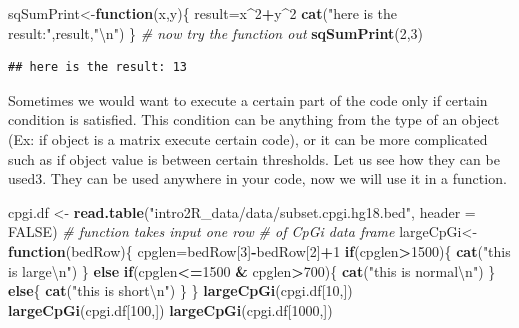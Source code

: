 \documentclass[12pt,]{krantz}
\newenvironment{Shaded}{\begin{snugshade}}{\end{snugshade}}
\newcommand{\CharTok}[1]{\textcolor[rgb]{0.31,0.60,0.02}{#1}}
\newcommand{\CommentTok}[1]{\textcolor[rgb]{0.56,0.35,0.01}{\textit{#1}}}
\newcommand{\ControlFlowTok}[1]{\textcolor[rgb]{0.13,0.29,0.53}{\textbf{#1}}}
\newcommand{\DataTypeTok}[1]{\textcolor[rgb]{0.13,0.29,0.53}{#1}}
\newcommand{\DecValTok}[1]{\textcolor[rgb]{0.00,0.00,0.81}{#1}}
\newcommand{\KeywordTok}[1]{\textcolor[rgb]{0.13,0.29,0.53}{\textbf{#1}}}
\newcommand{\NormalTok}[1]{#1}
\newcommand{\OperatorTok}[1]{\textcolor[rgb]{0.81,0.36,0.00}{\textbf{#1}}}
\newcommand{\OtherTok}[1]{\textcolor[rgb]{0.56,0.35,0.01}{#1}}
\newcommand{\StringTok}[1]{\textcolor[rgb]{0.31,0.60,0.02}{#1}}
\theoremstyle{definition}
\theoremstyle{definition}
\theoremstyle{definition}
\theoremstyle{remark}
\begin{document}
\begin{Shaded}
\begin{Highlighting}[]
\NormalTok{sqSumPrint<-}\ControlFlowTok{function}\NormalTok{(x,y)\{}
\NormalTok{result=x}\OperatorTok{^}\DecValTok{2}\OperatorTok{+}\NormalTok{y}\OperatorTok{^}\DecValTok{2}
\KeywordTok{cat}\NormalTok{(}\StringTok{"here is the result:"}\NormalTok{,result,}\StringTok{"}\CharTok{\textbackslash{}n}\StringTok{"}\NormalTok{)}
\NormalTok{\}}
\CommentTok{# now try the function out}
\KeywordTok{sqSumPrint}\NormalTok{(}\DecValTok{2}\NormalTok{,}\DecValTok{3}\NormalTok{)}
\end{Highlighting}
\end{Shaded}

\begin{verbatim}
## here is the result: 13
\end{verbatim}

Sometimes we would want to execute a certain part of the code only if
certain condition is satisfied. This condition can be anything from the
type of an object (Ex: if object is a matrix execute certain code), or
it can be more complicated such as if object value is between certain
thresholds. Let us see how they can be used3. They can be used anywhere
in your code, now we will use it in a function.

\begin{Shaded}
\begin{Highlighting}[]
\NormalTok{cpgi.df <-}\StringTok{ }\KeywordTok{read.table}\NormalTok{(}\StringTok{"intro2R_data/data/subset.cpgi.hg18.bed"}\NormalTok{, }\DataTypeTok{header =} \OtherTok{FALSE}\NormalTok{)}
\CommentTok{# function takes input one row}
\CommentTok{# of CpGi data frame}
\NormalTok{largeCpGi<-}\ControlFlowTok{function}\NormalTok{(bedRow)\{}
\NormalTok{ cpglen=bedRow[}\DecValTok{3}\NormalTok{]}\OperatorTok{-}\NormalTok{bedRow[}\DecValTok{2}\NormalTok{]}\OperatorTok{+}\DecValTok{1}
 \ControlFlowTok{if}\NormalTok{(cpglen}\OperatorTok{>}\DecValTok{1500}\NormalTok{)\{}
    \KeywordTok{cat}\NormalTok{(}\StringTok{"this is large}\CharTok{\textbackslash{}n}\StringTok{"}\NormalTok{)}
\NormalTok{ \}}
 \ControlFlowTok{else} \ControlFlowTok{if}\NormalTok{(cpglen}\OperatorTok{<=}\DecValTok{1500} \OperatorTok{&}\StringTok{ }\NormalTok{cpglen}\OperatorTok{>}\DecValTok{700}\NormalTok{)\{}
    \KeywordTok{cat}\NormalTok{(}\StringTok{"this is normal}\CharTok{\textbackslash{}n}\StringTok{"}\NormalTok{)}
\NormalTok{ \}}
 \ControlFlowTok{else}\NormalTok{\{}
    \KeywordTok{cat}\NormalTok{(}\StringTok{"this is short}\CharTok{\textbackslash{}n}\StringTok{"}\NormalTok{)}
\NormalTok{ \}}
\NormalTok{\}}
\KeywordTok{largeCpGi}\NormalTok{(cpgi.df[}\DecValTok{10}\NormalTok{,])}
\KeywordTok{largeCpGi}\NormalTok{(cpgi.df[}\DecValTok{100}\NormalTok{,])}
\KeywordTok{largeCpGi}\NormalTok{(cpgi.df[}\DecValTok{1000}\NormalTok{,])}
\end{Highlighting}
\end{Shaded}
\end{document}
